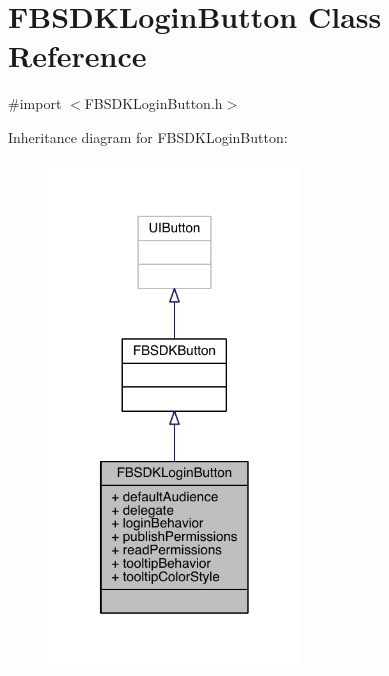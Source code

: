 \hypertarget{interface_f_b_s_d_k_login_button}{\section{F\-B\-S\-D\-K\-Login\-Button Class Reference}
\label{interface_f_b_s_d_k_login_button}
}


{\ttfamily \#import $<$F\-B\-S\-D\-K\-Login\-Button.\-h$>$}



Inheritance diagram for F\-B\-S\-D\-K\-Login\-Button\-:
\nopagebreak
\begin{figure}[H]
\begin{center}
\leavevmode
\includegraphics[width=190pt]{interface_f_b_s_d_k_login_button__inherit__graph}
\end{center}
\end{figure}


